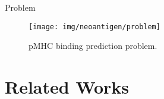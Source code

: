 \documentclass[10pt]{beamer}
\newcommand{\1}{
	\setbeamertemplate{background}{
		\texttt{[image: img/1]}
		\tikz[overlay] \fill[fill opacity=0.75,fill=white] (0,0) rectangle (-\paperwidth,\paperheight);
	}
}
\begin{document}
\begin{frame}{Problem}{}	
	\begin{figure}
			\texttt{[image: img/neoantigen/problem]}
			\caption{pMHC binding prediction problem.}
		\end{figure}
\end{frame}




\section{Related Works}
\end{document}
